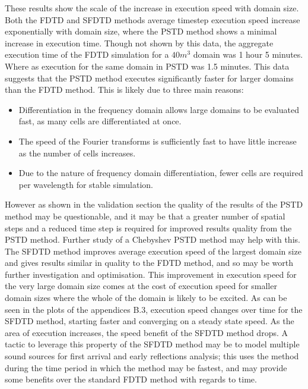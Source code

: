 These results show the scale of the increase in execution speed with domain size. Both the FDTD and SFDTD methods average timestep execution speed increase exponentially with domain size, where the PSTD method shows a minimal increase in execution time. Though not shown by this data, the aggregate execution time of the FDTD simulation for a $40m^3$ domain was 1 hour 5 minutes. Where as execution for the same domain in PSTD was 1.5 minutes. This data suggests that the PSTD method executes significantly faster for larger domains than the FDTD method. This is likely due to three main reasons: \\
\begin{itemize}
\item Differentiation in the frequency domain allows large domains to be evaluated fast, as many cells are differentiated at once.
\item The speed of the Fourier transforms is sufficiently fast to have little increase as the number of cells increases. 
\item Due to the nature of frequency domain differentiation, fewer cells are required per wavelength for stable simulation.
\end{itemize}
However as shown in the validation section the quality of the results of the PSTD method may be questionable, and it may be that a greater number of spatial steps and a reduced time step is required for improved results quality from the PSTD method. Further study of a Chebyshev PSTD method may help with this. \\

The SFDTD method improves average execution speed of the largest domain size and gives results similar in quality to the FDTD method, and so may be worth further investigation and optimisation. This improvement in execution speed for the very large domain size comes at the cost of execution speed for smaller domain sizes where the whole of the domain is likely to be excited. As can be seen in the plots of the appendices B.3, execution speed changes over time for the SFDTD method, starting faster and converging on a steady state speed. As the area of execution increases, the speed benefit of the SFDTD method drops. A tactic to leverage this property of the SFDTD method may be to model multiple sound sources for first arrival and early reflections analysis; this uses the method during the time period in which the method may be fastest, and may provide some benefits over the standard FDTD method with regards to time.

